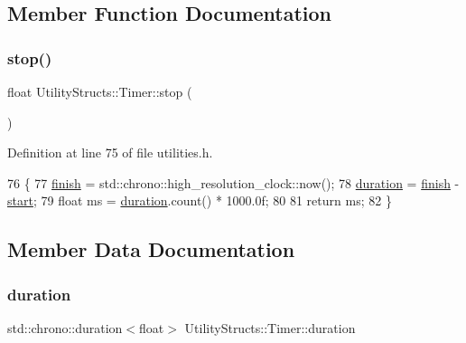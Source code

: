 \subsection{Member Function Documentation}
\mbox{\label{class_utility_structs_1_1_timer_a12f62b57c263d563efd6089cff52355f}} 
\subsubsection{\texorpdfstring{stop()}{stop()}}
{\footnotesize\ttfamily float Utility\+Structs\+::\+Timer\+::stop (\begin{DoxyParamCaption}{ }\end{DoxyParamCaption})\hspace{0.3cm}{\ttfamily [inline]}}



Definition at line 75 of file utilities.\+h.


\begin{DoxyCode}
76     \{
77         \hyperlink{class_utility_structs_1_1_timer_a9b87226726489b3885d6faf4373c34b5}{finish} = std::chrono::high\_resolution\_clock::now();
78         \hyperlink{class_utility_structs_1_1_timer_aa78ff6477de7008371025bd459a262e4}{duration} = \hyperlink{class_utility_structs_1_1_timer_a9b87226726489b3885d6faf4373c34b5}{finish} - \hyperlink{class_utility_structs_1_1_timer_a60bc754cb86990dad0003e8d49048c07}{start};
79         \textcolor{keywordtype}{float} ms = \hyperlink{class_utility_structs_1_1_timer_aa78ff6477de7008371025bd459a262e4}{duration}.count() * 1000.0f;
80 
81         \textcolor{keywordflow}{return} ms;
82     \}
\end{DoxyCode}


\subsection{Member Data Documentation}
\mbox{\label{class_utility_structs_1_1_timer_aa78ff6477de7008371025bd459a262e4}} 
\subsubsection{\texorpdfstring{duration}{duration}}
{\footnotesize\ttfamily std\+::chrono\+::duration$<$float$>$ Utility\+Structs\+::\+Timer\+::duration}



